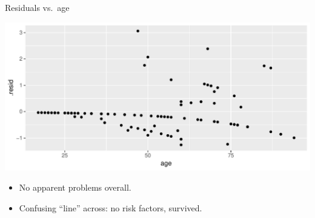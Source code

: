 \begin{frame}[fragile]{Residuals vs.\ age}

 
\begin{knitrout}
\color{fgcolor}\begin{kframe}
\begin{alltt}
\hlkwb{=}
\hlstd{(}\hlopt{+}\hlstd{()}
\end{alltt}
\end{kframe}
\includegraphics[width=\maxwidth]{figure/virtusentella-1} 

\end{knitrout}
  
  
\begin{itemize}
\item No apparent problems overall.
\item Confusing ``line'' across: no risk factors, survived. 
\end{itemize}
  
\end{frame}

